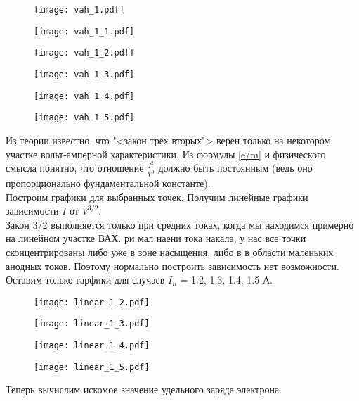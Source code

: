 \documentclass[a4paper,12pt]{article}
\theoremstyle{definition}
\begin{document}
    
    \begin{figure}[ht]
        \centering
        \texttt{[image: vah\_1.pdf]}
    \end{figure}
    \begin{figure}[ht]
        \centering
        \texttt{[image: vah\_1\_1.pdf]}
    \end{figure}
    \begin{figure}[ht]
        \centering
        \texttt{[image: vah\_1\_2.pdf]}
    \end{figure}
    \begin{figure}[ht]
        \centering
        \texttt{[image: vah\_1\_3.pdf]}
    \end{figure}
    \begin{figure}[ht]
        \centering
        \texttt{[image: vah\_1\_4.pdf]}
    \end{figure}
    
    \begin{figure}[ht]
        \centering
        \texttt{[image: vah\_1\_5.pdf]}
    \end{figure}


Из теории известно, что "<закон трех вторых"> верен только на некотором участке вольт-амперной характеристики. Из формулы \eqref{e/m} и физического смысла понятно, что отношение $ \frac{I^2}{V^3} $ должно быть постоянным (ведь оно пропорционально фундаментальной константе).
\\

Построим графики для выбранных точек. Получим линейные графики зависимости $I$ от $V^{3/2}$.
\\

Закон 3/2 выполняется только при средних токах, когда мы находимся примерно на линейном участке ВАХ. ри мал наени тока накала, у нас все точки сконцентрированы либо уже в зоне насыщения, либо в в области маленьких анодных токов. Поэтому нормально построить зависимость нет возможности.\\ 
Оставим только гарфики для случаев $I_n$ = 1.2, 1.3, 1.4, 1.5 $А$.


\begin{figure}[H]
    \centering
    \texttt{[image: linear\_1\_2.pdf]}
\end{figure}

\begin{figure}[H]
    \centering
    \texttt{[image: linear\_1\_3.pdf]}
\end{figure}
\begin{figure}[H]
    \centering
    \texttt{[image: linear\_1\_4.pdf]}
\end{figure}
\begin{figure}[H]
    \centering
    \texttt{[image: linear\_1\_5.pdf]}
\end{figure}
Теперь вычислим искомое значение удельного заряда электрона.
\end{document}
